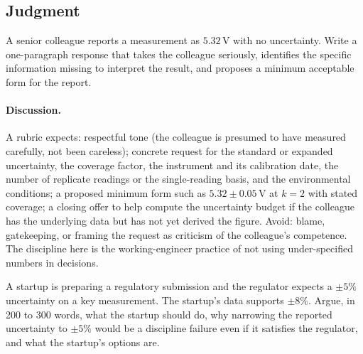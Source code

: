 \subsection*{Judgment}

\begin{exercise}
A senior colleague reports a measurement as $5.32 \,\si{\volt}$
with no uncertainty. Write a one-paragraph response that takes the
colleague seriously, identifies the specific information missing
to interpret the result, and proposes a minimum acceptable form
for the report.
\end{exercise}

\paragraph{Discussion.}
A rubric expects: respectful tone (the colleague is presumed to
have measured carefully, not been careless); concrete request for
the standard or expanded uncertainty, the coverage factor, the
instrument and its calibration date, the number of replicate
readings or the single-reading basis, and the environmental
conditions; a proposed minimum form such as $5.32 \pm 0.05 \,\si
{\volt}$ at $k = 2$ with stated coverage; a closing offer to
help compute the uncertainty budget if the colleague has the
underlying data but has not yet derived the figure. Avoid: blame,
gatekeeping, or framing the request as criticism of the
colleague's competence. The discipline here is the
working-engineer practice of not using under-specified numbers in
decisions.

\begin{exercise}
A startup is preparing a regulatory submission and the regulator
expects a $\pm 5\%$ uncertainty on a key measurement. The startup's
data supports $\pm 8\%$. Argue, in 200 to 300 words, what the
startup should do, why narrowing the reported uncertainty to
$\pm 5\%$ would be a discipline failure even if it satisfies the
regulator, and what the startup's options are.
\end{exercise}

